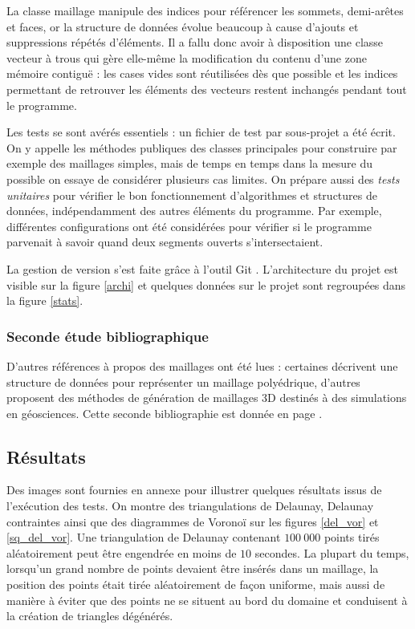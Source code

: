 \documentclass[12pt,a4paper]{report}
\begin{document}
La classe maillage manipule des indices pour référencer les sommets, demi-arêtes et faces, or la structure de données évolue beaucoup à cause d'ajouts et suppressions répétés d'éléments. Il a fallu donc avoir à disposition une classe \og vecteur à trous \fg{} qui gère elle-même la modification du contenu d'une zone mémoire contiguë : les cases vides sont réutilisées dès que possible et les indices permettant de retrouver les éléments des vecteurs restent inchangés pendant tout le programme.

Les tests se sont avérés essentiels : un fichier de test par sous-projet a été écrit. On y appelle les méthodes publiques des classes principales pour construire par exemple des maillages simples, mais de temps en temps dans la mesure du possible on essaye de considérer plusieurs cas limites. On prépare aussi des \emph{tests unitaires} pour vérifier le bon fonctionnement d'algorithmes et structures de données, indépendamment des autres éléments du programme. Par exemple, différentes configurations ont été considérées pour vérifier si le programme parvenait à savoir quand deux segments ouverts s'intersectaient.

\vspace{1cm}
La gestion de version s'est faite grâce à l'outil Git \cite{Git}.
L'architecture du projet est visible sur la figure \ref{archi} et quelques données sur le projet sont regroupées dans la figure \ref{stats}.

\subsubsection{Seconde étude bibliographique}

D'autres références à propos des maillages ont été lues : certaines décrivent une structure de données pour représenter un maillage polyédrique, d'autres proposent des méthodes de génération de maillages 3D destinés à des simulations en géosciences. Cette seconde bibliographie est donnée en page \pageref{second_biblio}.

\subsection{Résultats}

Des images sont fournies en annexe pour illustrer quelques résultats issus de l'exécution des tests. On montre des triangulations de Delaunay, Delaunay contraintes ainsi que des diagrammes de Voronoï sur les figures \ref{del_vor} et \ref{sq_del_vor}. Une triangulation de Delaunay contenant $100\ 000$ points tirés aléatoirement peut être engendrée en moins de $10$ secondes. La plupart du temps, lorsqu'un grand nombre de points devaient être insérés dans un maillage, la position des points était tirée aléatoirement de façon uniforme, mais aussi de manière à éviter que des points ne se situent au bord du domaine et conduisent à la création de triangles dégénérés.
\end{document}
